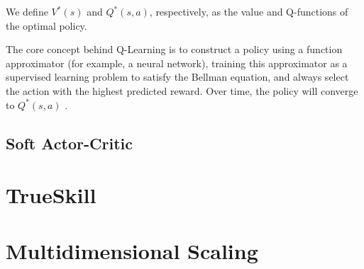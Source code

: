 We define $V^*(s)$ and $Q^*(s, a)$, respectively, as the value and Q-functions of the optimal policy.

The core concept behind Q-Learning is to construct a policy using a function approximator (for example, a neural network), training this approximator as a supervised learning problem to satisfy the Bellman equation, and always select the action with the highest predicted reward.
Over time, the policy will converge to $Q^*(s, a)$ \cite{Qlearn_convergence}.



\subsection{Soft Actor-Critic}


\section{TrueSkill}


\section{Multidimensional Scaling}